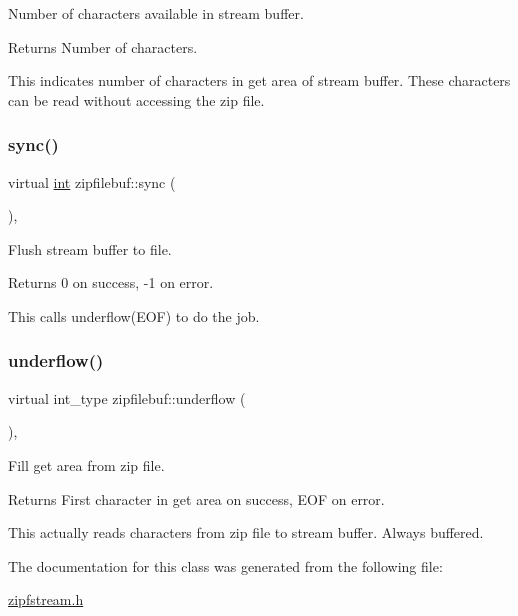 Number of characters available in stream buffer. 

\begin{DoxyReturn}{Returns}
Number of characters.
\end{DoxyReturn}
This indicates number of characters in get area of stream buffer. These characters can be read without accessing the zip file. \mbox{\label{classzipfilebuf_a9db1a908810f7eee6dab4351c2c6924c}} 
\subsubsection{\texorpdfstring{sync()}{sync()}}
{\footnotesize\ttfamily virtual \hyperlink{lp__lib_8h_adeb9ec6400320e4923ac9d836d509ddb}{int} zipfilebuf\+::sync (\begin{DoxyParamCaption}{ }\end{DoxyParamCaption})\hspace{0.3cm}{\ttfamily [protected]}, {\ttfamily [virtual]}}



Flush stream buffer to file. 

\begin{DoxyReturn}{Returns}
0 on success, -\/1 on error.
\end{DoxyReturn}
This calls underflow(\+E\+O\+F) to do the job. \mbox{\label{classzipfilebuf_a6ac8465585d86e24c76fb43d3b8ace99}} 
\subsubsection{\texorpdfstring{underflow()}{underflow()}}
{\footnotesize\ttfamily virtual int\+\_\+type zipfilebuf\+::underflow (\begin{DoxyParamCaption}{ }\end{DoxyParamCaption})\hspace{0.3cm}{\ttfamily [protected]}, {\ttfamily [virtual]}}



Fill get area from zip file. 

\begin{DoxyReturn}{Returns}
First character in get area on success, E\+OF on error.
\end{DoxyReturn}
This actually reads characters from zip file to stream buffer. Always buffered. 

The documentation for this class was generated from the following file\+:\begin{DoxyCompactItemize}
\item 
\hyperlink{zipfstream_8h}{zipfstream.\+h}\end{DoxyCompactItemize}
